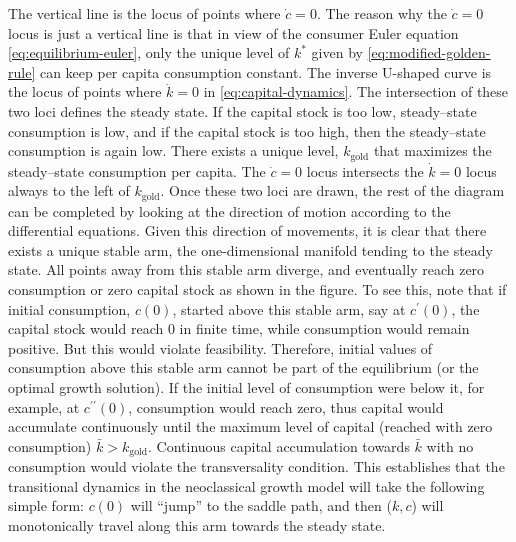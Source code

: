 \documentclass[\topdir/lecture\_notes.tex]{subfiles}
\begin{document}
The vertical line is the locus of points where \(\dot{c}=0\). The reason why the \(\dot{c}=0\) locus is just a vertical line is that in view of the consumer Euler equation \eqref{eq:equilibrium-euler}, only the unique level of \(k^{*}\) given by \eqref{eq:modified-golden-rule} can keep per capita consumption constant. The inverse U-shaped curve is the locus of points where \(\dot{k}=0\) in \eqref{eq:capital-dynamics}. The intersection of these two loci defines the steady state. If the capital stock is too low, steady--state consumption is low, and if the capital stock is too high, then the steady--state consumption is again low. There exists a unique level, \(k_{\text{gold}}\) that maximizes the steady--state consumption per capita. The \(\dot{c}=0\) locus intersects the \(\dot{k}=0\) locus always to the left of \(k_{\text{gold}}\). Once these two loci are drawn, the rest of the diagram can be completed by looking at the direction of motion according to the differential equations. Given this direction of movements, it is clear that there exists a unique stable arm, the one-dimensional manifold tending to the steady state. All points away from this stable arm diverge, and eventually reach zero consumption or zero capital stock as shown in the figure. To see this, note that if initial consumption, \(c(0)\), started above this stable arm, say at \(c^{\prime}(0)\), the capital stock would reach 0 in finite time, while consumption would remain positive. But this would violate feasibility. Therefore, initial values of consumption above this stable arm cannot be part of the equilibrium (or the optimal growth solution). If the initial level of consumption were below it, for example, at \(c^{\prime \prime}(0)\), consumption would reach zero, thus capital would accumulate continuously until the maximum level of capital (reached with zero consumption) \(\bar{k}>k_{\text{gold}}\). Continuous capital accumulation towards \(\bar{k}\) with no consumption would violate the transversality condition. This establishes that the transitional dynamics in the neoclassical growth model will take the following simple form: \(c(0)\) will ``jump'' to the saddle path, and then (\(k, c\)) will monotonically travel along this arm towards the steady state.
\end{document}
